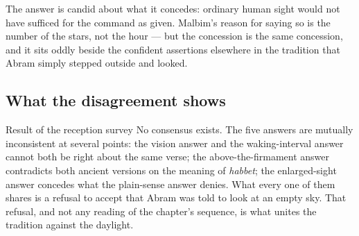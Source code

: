 The answer is candid about what it concedes: ordinary human sight would not have
sufficed for the command as given. Malbim's reason for saying so is the number
of the stars, not the hour --- but the concession is the same concession, and it
sits oddly beside the confident assertions elsewhere in the tradition that Abram
simply stepped outside and looked.

\subsection{What the disagreement shows}

\begin{studybox}{Result of the reception survey}
No consensus exists. The five answers are mutually inconsistent at several
points: the vision answer and the waking-interval answer cannot both be right
about the same verse; the above-the-firmament answer contradicts both ancient
versions on the meaning of \textit{habbet}; the enlarged-sight answer concedes
what the plain-sense answer denies. What every one of them shares is a refusal
to accept that Abram was told to look at an empty sky. That refusal, and not any
reading of the chapter's sequence, is what unites the tradition against the
daylight.
\end{studybox}
